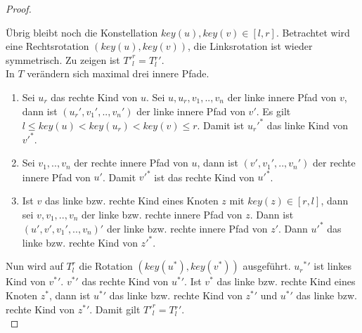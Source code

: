 \documentclass[a4paper,12pt]{article}
\begin{document}
\begin{proof}
\begin{enumerate}
	\end{enumerate}	
	\noindent Übrig bleibt noch die Konstellation $\mathit{key}\left(u\right),\mathit{key}(v) \in \left[l,r\right]$. 
	Betrachtet wird eine Rechtsrotation $\left(\mathit{key}\left(u\right),\mathit{key}\left(v\right)\right)$, die Linksrotation ist wieder symmetrisch. 
	Zu zeigen ist ${T'}^r_l = T{^r_l}' $.\\
	In $T$ verändern sich maximal drei innere Pfade.
	\begin{enumerate}
		\item Sei $u_r$ das rechte Kind von $u$. Sei $u,u_r,v_1,..,v_n$ der linke innere Pfad von $v$, dann ist $\left({u_r}',{v_1}',..,{v_n}'\right)$ der linke innere Pfad von $v'$. Es gilt ${l \leq \mathit{key}\left(u\right) < \mathit{key}\left(u_r\right) < \mathit{key}\left(v\right) \leq r}$. Damit ist ${{u_r}'}^*$ das linke Kind von ${v'}^*$.
		\item Sei $v_1,..,v_n$ der rechte innere Pfad von $u$, dann ist $\left(v',{v_1}',..,{v_n}'\right)$ der rechte innere Pfad von $u'$. Damit  ${v'}^*$ ist das rechte Kind von ${u'}^*$.
		\item Ist $v$ das linke bzw. rechte Kind eines Knoten $z$ mit $\mathit{key}(z) \in \left[r,l\right]$, dann sei  $v,v_1,..,v_n$ der linke bzw. rechte innere Pfad von $z$. Dann ist  $\left(u',v',{v_1}',..,{v_n}\right)'$ der linke bzw. rechte innere Pfad von $z'$. Dann ${u'}^*$ das linke bzw. rechte Kind von ${z'}^*$.
	\end{enumerate}
	\noindent Nun wird auf ${T}^r_l$ die Rotation $ \left(\mathit{key}\left(u^*\right),\mathit{key}\left(v^*\right)\right)$ ausgeführt. ${{u_r}^*}'$ ist linkes Kind von $v{^*}'$. $v{^*}'$ das rechte Kind von $u{^*}'$. Ist $v^*$ das linke bzw. rechte Kind eines Knoten $z^*$, dann ist $u{^*}'$ das linke bzw. rechte Kind von $z{^*}'$ und $u{^*}'$ das linke bzw. rechte Kind von $z{^*}'$. Damit gilt ${T'}^r_l = T{^r_l}'$.\\
	
\end{proof}
\end{document}
